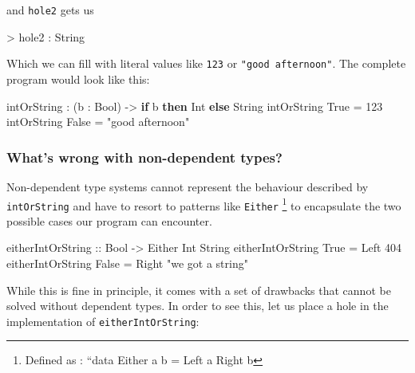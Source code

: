 \documentclass[
]{article}
\newenvironment{Shaded}{}{}
\newcommand{\DataTypeTok}[1]{\textcolor[rgb]{0.56,0.13,0.00}{#1}}
\newcommand{\DecValTok}[1]{\textcolor[rgb]{0.25,0.63,0.44}{#1}}
\newcommand{\KeywordTok}[1]{\textcolor[rgb]{0.00,0.44,0.13}{\textbf{#1}}}
\newcommand{\NormalTok}[1]{#1}
\newcommand{\OperatorTok}[1]{\textcolor[rgb]{0.40,0.40,0.40}{#1}}
\newcommand{\OtherTok}[1]{\textcolor[rgb]{0.00,0.44,0.13}{#1}}
\newcommand{\StringTok}[1]{\textcolor[rgb]{0.25,0.44,0.63}{#1}}
\begin{document}
and \texttt{hole2} gets us

\begin{Shaded}
\begin{Highlighting}[]
\OperatorTok{\textgreater{}}\NormalTok{ hole2 }\OperatorTok{:} \DataTypeTok{String}
\end{Highlighting}
\end{Shaded}

Which we can fill with literal values like \texttt{123} or
\texttt{"good\ afternoon"}. The complete program would look like this:

\begin{Shaded}
\begin{Highlighting}[]
\NormalTok{intOrString }\OperatorTok{:}\NormalTok{ (b }\OperatorTok{:} \DataTypeTok{Bool}\NormalTok{) }\OtherTok{{-}\textgreater{}} \KeywordTok{if}\NormalTok{ b }\KeywordTok{then} \DataTypeTok{Int} \KeywordTok{else} \DataTypeTok{String}
\NormalTok{intOrString }\DataTypeTok{True} \OtherTok{=} \DecValTok{123}
\NormalTok{intOrString }\DataTypeTok{False} \OtherTok{=} \StringTok{"good afternoon"}
\end{Highlighting}
\end{Shaded}

\hypertarget{whats-wrong-with-non-dependent-types}{%
\subsubsection{What's wrong with non-dependent
types?}\label{whats-wrong-with-non-dependent-types}}

Non-dependent type systems cannot represent the behaviour described by
\texttt{intOrString} and have to resort to patterns like \texttt{Either}
\footnote{Defined as : ``data Either a b = Left a \textbar{} Right b} to
encapsulate the two possible cases our program can encounter.

\begin{Shaded}
\begin{Highlighting}[]
\OtherTok{eitherIntOrString ::} \DataTypeTok{Bool} \OtherTok{{-}\textgreater{}} \DataTypeTok{Either} \DataTypeTok{Int} \DataTypeTok{String}
\NormalTok{eitherIntOrString }\DataTypeTok{True} \OtherTok{=} \DataTypeTok{Left} \DecValTok{404}
\NormalTok{eitherIntOrString }\DataTypeTok{False} \OtherTok{=} \DataTypeTok{Right} \StringTok{"we got a string"}
\end{Highlighting}
\end{Shaded}

While this is fine in principle, it comes with a set of drawbacks that
cannot be solved without dependent types. In order to see this, let us
place a hole in the implementation of \texttt{eitherIntOrString}:
\end{document}
